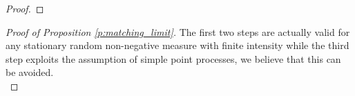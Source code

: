 \documentclass[12pt]{article}
\newcommand{\1}{\mathbf{1}}
\newcommand{\RL}[1]{\textcolor{blue}{#1}}
\newcommand{\RL}[1]{#1}%
\renewcommand{\footnote}[1]{}
\begin{document}
{{{{{{{\begin{proof}
\end{proof}}
}

\begin{proof}[Proof of Proposition \ref{p:matching_limit}]

 {The first two steps are actually valid for any stationary random non-negative measure with finite intensity while the third step exploits the assumption of simple point processes, we believe that this can be avoided.} \\


\end{proof}}}}}}
\end{document}
